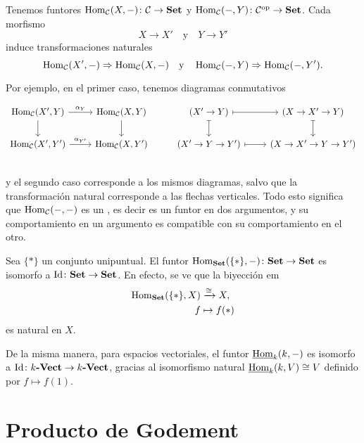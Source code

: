 \documentclass{article}
\numberwithin{equation}{section}
\theoremstyle{definition}
\begin{document}
\begin{ejemplo}
  Tenemos funtores $\operatorname{Hom}_\mathcal{C} (X,-)\colon \mathcal{C} \to \text{\bf Set}$ y
  $\operatorname{Hom}_\mathcal{C} (-,Y)\colon \mathcal{C}^\mathrm{op} \to \text{\bf Set}$. Cada
  morfismo
  $$X \to X' \quad\text{y}\quad Y \to Y'$$
  induce transformaciones naturales
  \[ \operatorname{Hom}_\mathcal{C} (X',-) \Rightarrow \operatorname{Hom}_\mathcal{C} (X,-) \quad\text{y}\quad
     \operatorname{Hom}_\mathcal{C} (-, Y) \Rightarrow \operatorname{Hom}_\mathcal{C} (-, Y'). \]

  Por ejemplo, en el primer caso, tenemos diagramas conmutativos

  \[ \begin{tikzcd}
      \Hom_\vcateg{C} (X',Y)\ar{r}{\alpha_Y}\ar{d} & \Hom_\vcateg{C} (X,Y)\ar{d} & (X'\to Y) \ar[|->]{r}\ar[|->]{d} & (X \to X' \to Y) \ar[|->]{d} \\
      \Hom_\vcateg{C} (X',Y')\ar{r}{\alpha_{Y'}} & \Hom_\vcateg{C} (X,Y') & (X'\to Y\to Y') \ar[|->]{r} & (X\to X' \to Y \to Y') \\
    \end{tikzcd} \]
  y el segundo caso corresponde a los mismos diagramas, salvo que la
  transformación natural corresponde a las flechas verticales. Todo esto
  significa que $\operatorname{Hom}_\mathcal{C} (-,-)$ es un , es decir es un
  funtor en dos argumentos, y su comportamiento en un argumento es compatible
  con su comportamiento en el otro.
\end{ejemplo}

\begin{ejemplo}
  Sea $\{ \ast \}$ un conjunto unipuntual. El funtor
  $\operatorname{Hom}_{\text{\bf Set}} (\{ \ast \}, -)\colon \text{\bf Set} \to \text{\bf Set}$ es
  isomorfo a $\operatorname{Id}\colon \text{\bf Set} \to \text{\bf Set}$. En efecto, se ve que la
  biyección em
  \begin{align*}
    \operatorname{Hom}_{\text{\bf Set}} (\{ \ast \}, X) & \xrightarrow{\cong} X,\\
    f & \mapsto f (\ast)
  \end{align*}
  es natural en $X$.

  De la misma manera, para espacios vectoriales, el funtor $\underline{\operatorname{Hom}}_k (k, -)$ es
  isomorfo a $\operatorname{Id}\colon k\text{\bf -Vect} \to k\text{\bf -Vect}$, gracias al
  isomorfismo natural $\underline{\operatorname{Hom}}_k (k, V) \cong V$ definido por $f \mapsto f (1)$.
\end{ejemplo}


\section{Producto de Godement}
\label{sec:producto-de-godement}
\end{document}
